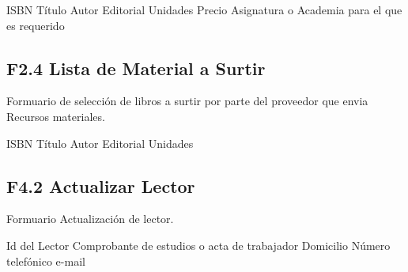 \begin{UClist}
	\UCli ISBN
	\UCli Título
	\UCli Autor
	\UCli Editorial
	\UCli Unidades
	\UCli Precio
	\UCli Asignatura o Academia para el que es requerido
\end{UClist}


\subsection{F2.4 Lista de Material a Surtir}
Formuario de selección de libros a surtir por parte del proveedor que envia Recursos materiales.\\

\begin{UClist}
	\UCli ISBN
	\UCli Título
	\UCli Autor
	\UCli Editorial
	\UCli Unidades
\end{UClist}







\subsection{F4.2 Actualizar Lector }
  Formuario Actualización de lector.\\

	\begin{UClist}
      \UCli Id del Lector
      \UCli Comprobante de estudios o acta de trabajador
      \UCli Domicilio
      \UCli Número telefónico
      \UCli e-mail
    \end{UClist}





